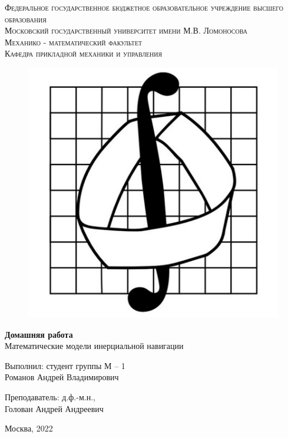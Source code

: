\documentclass[a4paper,14pt]{article}
\theoremstyle{plain} %
\theoremstyle{definition} %
\theoremstyle{remark} %
\begin{document}
\begin{center}
    {\textsc{Федеральное государственное бюджетное образовательное
            учреждение высшего образования
        }}\\
    {\textsc{Московский государственный университет имени М.В. Ломоносова
    }} \\
    \vspace{0.2cm}
    {\textsc{Механико - математический факультет}}\\
    \vspace{0.2cm}
    {\textsc{Кафедра прикладной механики и управления}}\\
    \hfill \break
    \begin{figure}[h!]
        \centering
        \includegraphics[width=0.30\linewidth]{emblema}
        \label{fig:emblema}
    \end{figure}
    \hfill \break
    \hfill \break
    \large{\textbf{Домашняя работа}\\
        \hfill \break Математические модели инерциальной навигации
    }
\end{center}

\hfill \break
\hfill \break
\begin{flushright}
    {
        Выполнил: студент группы М -- 1 \\ Романов Андрей Владимирович}
\end{flushright}

\begin{flushright}
    {
        Преподаватель: д.ф.-м.н., \\ Голован Андрей Андреевич}
\end{flushright}
\hfill \break
\hfill \break
\begin{center} {Москва, 2022} \end{center}
\end{document}
